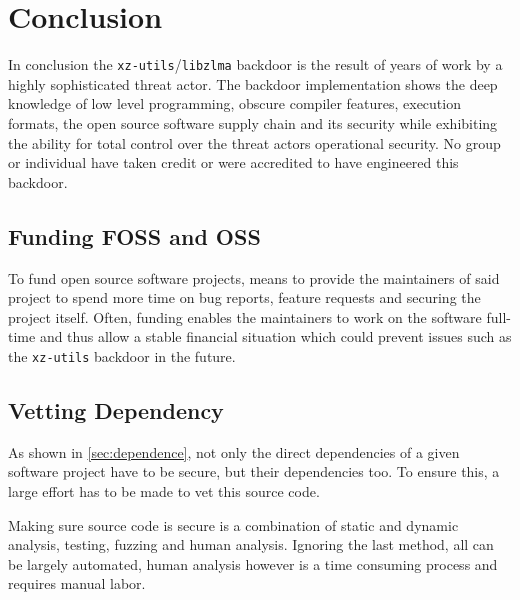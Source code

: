 \section{Conclusion}

In conclusion the \texttt{xz-utils}/\texttt{libzlma} backdoor is the result of
years of work by a highly sophisticated threat actor. The backdoor
implementation shows the deep knowledge of low level programming, obscure
compiler features, execution formats, the open source software supply chain and
its security while exhibiting the ability for total control over the threat
actors operational security. No group or individual have taken credit or were
accredited to have engineered this backdoor.

\subsection{Funding FOSS and OSS}

To fund open source software projects, means to provide the maintainers of
said project to spend more time on bug reports, feature requests and
securing the project itself. Often, funding enables the maintainers to work
on the software full-time and thus allow a stable financial situation which
could prevent issues such as the \texttt{xz-utils} backdoor in the future.

\subsection{Vetting Dependency}

As shown in \autoref{sec:dependence}, not only the direct dependencies of a
given software project have to be secure, but their dependencies too. To ensure
this, a large effort has to be made to vet this source code.

Making sure source code is secure is a combination of static and dynamic
analysis, testing, fuzzing and human analysis. Ignoring the last method, all
can be largely automated, human analysis however is a time consuming process
and requires manual labor.
